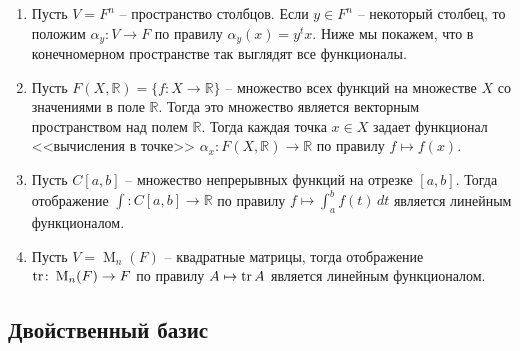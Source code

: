 \begin{enumerate}
\item Пусть $V = F^n$ -- пространство столбцов.
Если $y\in F^n$ -- некоторый столбец, то положим $\alpha_y \colon V\to F$ по правилу $\alpha_y(x) = y^t x$.
Ниже мы покажем, что в конечномерном пространстве так выглядят все функционалы.

\item Пусть $F(X, \mathbb R) = \{f\colon X\to \mathbb R\}$ -- множество всех функций на множестве $X$ со значениями в поле $\mathbb R$.
Тогда это множество является векторным пространством над полем $\mathbb R$.
Тогда каждая точка $x\in X$ задает функционал <<вычисления в точке>> $\alpha_x \colon F(X,\mathbb R)\to \mathbb R$ по правилу $f\mapsto f(x)$.

\item Пусть $C[a,b]$ -- множество непрерывных функций на отрезке $[a,b]$.
Тогда отображение $\int \colon C[a,b]\to \mathbb R$ по правилу $f \mapsto \int_a^b f(t)\,dt$ является линейным функционалом.

\item Пусть $V = \operatorname{M}_n(F)$ -- квадратные матрицы, тогда отображение $\operatorname{tr}\colon \operatorname{M}_n(F)\to F$ по правилу $A\mapsto \operatorname{tr} A$ является линейным функционалом.
\end{enumerate}


\subsection{Двойственный базис}

